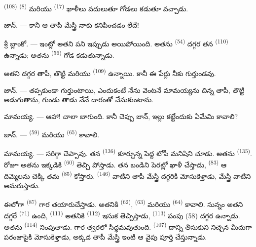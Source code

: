  \textsuperscript{(108)}  \textsuperscript{(8)} మరియు
 \textsuperscript{(17)} ఖాళీలు వదులుతూ గోడలు కడుతూ వచ్చాడు.

\textsc{జాన్}. --- కానీ ఆ తాపీ మేస్త్రి నాకు కనిపించడం లేదే!

శ్రీ \textsc{బ్లాంకో}. --- ఇంట్లో అతని పని ఇప్పుడు అయిపోయింది. అతను 
\textsuperscript{(54)} దగ్గర తన  \textsuperscript{(110)} ఉన్నాడు; అతను
 \textsuperscript{(56)} గోడ కడుతున్నాడు.

అతని దగ్గర తాపీ, తొట్టి మరియు  \textsuperscript{(109)} ఉన్నాయి. కానీ ఈ
పేర్లు నీకు గుర్తుండవు.

\textsc{జాన్}. --- తప్పకుండా గుర్తుంటాయి, ఎందుకంటే నేను వెంటనే మామయ్యను చిన్న తాపీ, తొట్టి
అడుగుతాను, గుండు తాడు నేనే దారంతో చేసుకుంటాను.

\VUsaut{3.0mm}
\VUsaut{3.0mm}

\textsc{మామయ్య}. --- ఆహా! చాలా బాగుంది. కానీ చెప్పు జాన్, ఇల్లు కట్టేందుకు ఏమేమి కావాలి?

\textsc{జాన్}. ---  \textsuperscript{(59)} మరియు 
\textsuperscript{(65)} కావాలి.

\textsc{మామయ్య}. --- సరిగ్గా చెప్పావు. తన  \textsuperscript{(136)} కూర్చున్న
పెద్ద టోపీ మనిషిని చూడు. అతను  \textsuperscript{(135)}. రోజూ అతను ఇక్కడికి
 \textsuperscript{(60)} తెచ్చి పోస్తాడు. తన బండిని పెరట్లో ఖాళీ
చేస్తాడు,  \textsuperscript{(83)} ఆ దిమ్మెలను చెక్కి తమ 
\textsuperscript{(85)} కోస్తారు.  \textsuperscript{(146)} వాటిని తాపీ మేస్త్రి
దగ్గరికి మోసుకెళ్తాడు, మేస్త్రి వాటిని అమరుస్తాడు.

ఈలోగా  \textsuperscript{(87)} గార తయారుచేస్తాడు. అతనికి 
\textsuperscript{(62)},  \textsuperscript{(63)} మరియు 
\textsuperscript{(64)} కావాలి. సున్నం అతని దగ్గరే  \textsuperscript{(71)} ఉంది,
 \textsuperscript{(111)} అతనికి 
\textsuperscript{(112)} ఇసుక తెచ్చిస్తాడు,  \textsuperscript{(113)} పంపు (58)
దగ్గర ఉన్నాడు. అతను  \textsuperscript{(114)} నింపుతాడు. గార త్వరలో
సిద్ధమవుతుంది.  \textsuperscript{(107)} దాన్ని తీసుకుని నిచ్చెన మీదుగా
పరంజాపైకి మోసుకెళ్తాడు, అక్కడ తాపీ మేస్త్రి ఇంటి ఆ వైపు పూర్తి చేస్తున్నాడు.

